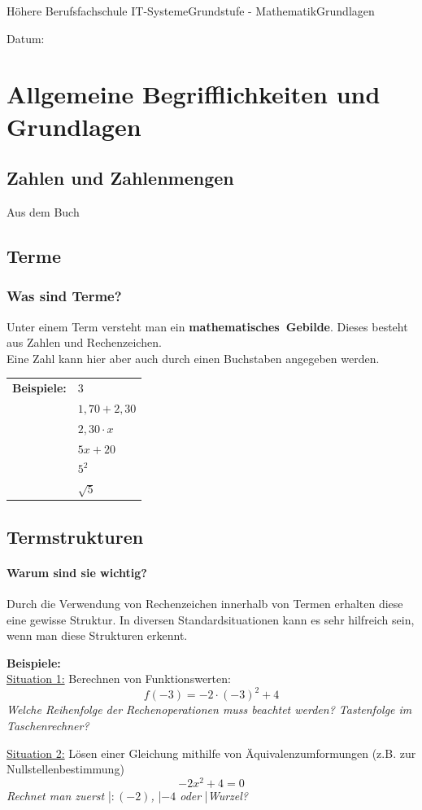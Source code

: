 \documentclass[11pt,twocolumn,oneside,openany,headings=optiontotoc,11pt,numbers=noenddot]{article}
\begin{document}
	\begin{worksheet}{Höhere Berufsfachschule IT-Systeme}{Grundstufe - Mathematik}{Grundlagen}
		\begin{framed}
			Datum:
		\end{framed}
		\section{Allgemeine Begrifflichkeiten und Grundlagen}
		\subsection{Zahlen und Zahlenmengen}
		Aus dem Buch
		\subsection{Terme}
		\subsubsection*{Was sind Terme?} Unter einem Term versteht man ein \mbox{\textbf{mathematisches Gebilde}}. Dieses besteht aus Zahlen und Rechenzeichen.\\
		Eine Zahl kann hier aber auch durch einen Buchstaben angegeben werden.\\
		\par
		\begin{tabularx}{0.5\textwidth}{ll}
			\noindent
			\textbf{Beispiele:} & \(3\)\\
			& \(1,70+2,30\)\\
			& \(2,30\cdot x\)\\
			& \(5x + 20\)\\
			& \(5^2\)\\
			& \(\sqrt{5}\)\\
		\end{tabularx}
		\subsection{Termstrukturen}
		\paragraph{Warum sind sie wichtig?}
		Durch die Verwendung von Rechenzeichen innerhalb von Termen erhalten diese eine gewisse Struktur. In diversen Standardsituationen kann es sehr hilfreich sein, wenn man diese Strukturen erkennt.
		\begin{framed}
			\noindent
			\textbf{Beispiele:}\\
			\underline{Situation 1:} Berechnen von Funktionswerten:
			\[f(-3) = -2\cdot (-3)^2 + 4\]
			\textit{Welche Reihenfolge der Rechenoperationen muss beachtet werden? Tastenfolge im Taschenrechner?}\\
			\par\noindent
			\underline{Situation 2:} Lösen einer Gleichung mithilfe von Äquivalenzumformungen (z.B. zur Nullstellenbestimmung)
			\[-2x^2 +4 = 0\]
			\textit{Rechnet man zuerst }|\textit{\(:(-2)\), }|\textit{\(-4\) oder }|\textit{\glqq{}Wurzel\grqq{}?}
		\end{framed}

\end{worksheet}
\end{document}
